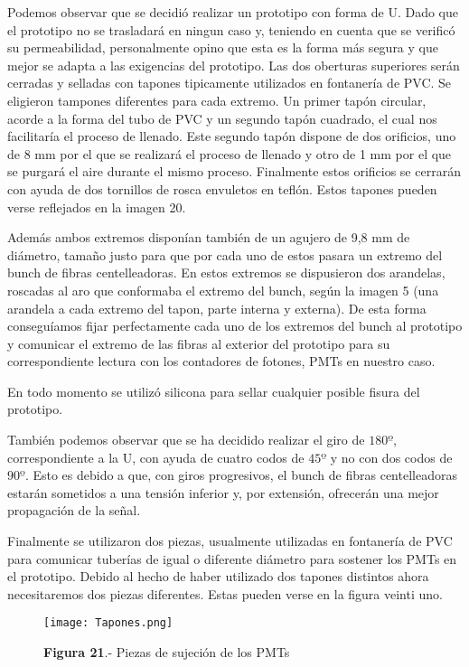 Podemos observar que se decidió realizar un prototipo con forma de U. Dado que el prototipo no se trasladará en ningun caso y, teniendo en cuenta que se verificó su permeabilidad, personalmente opino que esta es la forma más segura y que mejor se adapta a las exigencias del prototipo. Las dos oberturas superiores serán cerradas y selladas con tapones tipicamente utilizados en fontanería de PVC. Se eligieron tampones diferentes para cada extremo. Un primer tapón circular, acorde a la forma del tubo de PVC y un segundo tapón cuadrado, el cual nos facilitaría el proceso de llenado. Este segundo tapón dispone de dos orificios, uno de 8 mm por el que se realizará el proceso de llenado y otro de 1 mm por el que se purgará el aire durante el mismo proceso. Finalmente estos orificios se cerrarán con ayuda de dos tornillos de rosca envuletos en teflón. Estos tapones pueden verse reflejados en la imagen 20.

Además ambos extremos disponían también de un agujero de 9,8 mm de diámetro, tamaño justo para que por cada uno de estos pasara un extremo del bunch de fibras centelleadoras. En estos extremos se dispusieron dos arandelas, roscadas al aro que conformaba el extremo del bunch, según la imagen 5 (una arandela a cada extremo del tapon, parte interna y externa). De esta forma conseguíamos fijar perfectamente cada uno de los extremos del bunch al prototipo y comunicar el extremo de las fibras al exterior del prototipo para su correspondiente lectura con los contadores de fotones, PMTs en nuestro caso. 

En todo momento se utilizó silicona para sellar cualquier posible fisura del prototipo.

También podemos observar que se ha decidido realizar el giro de $180º$, correspondiente a la U, con ayuda de cuatro codos de $45º$ y no con dos codos de $90º$. Esto es debido a que, con giros progresivos, el bunch de fibras centelleadoras estarán sometidos a una tensión inferior y, por extensión, ofrecerán una mejor propagación de la señal.

Finalmente se utilizaron dos piezas, usualmente utilizadas en fontanería de PVC para comunicar tuberías de igual o diferente diámetro para sostener los PMTs en el prototipo. Debido al hecho de haber utilizado dos tapones distintos ahora necesitaremos dos piezas diferentes. Estas pueden verse en la figura veinti uno.

\begin{figure}[hbtp]
\centering
\texttt{[image: Tapones.png]}
\caption{\textbf{Figura 21}.- Piezas de sujeción de los PMTs}
\end{figure}

